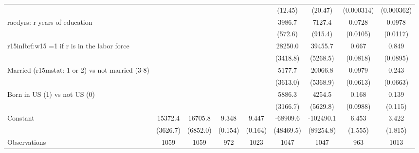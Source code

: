 \begin{table}[htbp]
\begin{tabular}{l*{8}{c}}
                &                  &                  &                  &                  &  (12.45)         &  (20.47)         &(0.000314)         &(0.000362)         \\
\addlinespace
raedyrs: r years of education&                  &                  &                  &                  &   3986.7\sym{***}&   7127.4\sym{***}&   0.0728\sym{***}&   0.0978\sym{***}\\
                &                  &                  &                  &                  &  (572.6)         &  (915.4)         & (0.0105)         & (0.0117)         \\
\addlinespace
r15inlbrf:w15 =1 if r is in the labor force&                  &                  &                  &                  &  28250.0\sym{***}&  39455.7\sym{***}&    0.667\sym{***}&    0.849\sym{***}\\
                &                  &                  &                  &                  & (3418.8)         & (5268.5)         & (0.0818)         & (0.0895)         \\
\addlinespace
Married (r15mstat: 1 or 2) vs not married (3-8)&                  &                  &                  &                  &   5177.7         &  20066.8\sym{***}&   0.0979         &    0.243\sym{***}\\
                &                  &                  &                  &                  & (3613.0)         & (5368.9)         & (0.0613)         & (0.0663)         \\
\addlinespace
Born in US (1) vs not US (0)&                  &                  &                  &                  &   5886.3\sym{*}  &   4254.5         &    0.168\sym{*}  &    0.139         \\
                &                  &                  &                  &                  & (3166.7)         & (5629.8)         & (0.0988)         &  (0.115)         \\
\addlinespace
Constant        &  15372.4\sym{***}&  16705.8\sym{**} &    9.348\sym{***}&    9.447\sym{***}& -68909.6         &-102490.1         &    6.453\sym{***}&    3.422\sym{*}  \\
                & (3626.7)         & (6852.0)         &  (0.154)         &  (0.164)         &(48469.5)         &(89254.8)         &  (1.555)         &  (1.815)         \\
\midrule
Observations    &     1059         &     1059         &      972         &     1023         &     1047         &     1047         &      963         &     1013         \\

\end{tabular}
\end{table}
